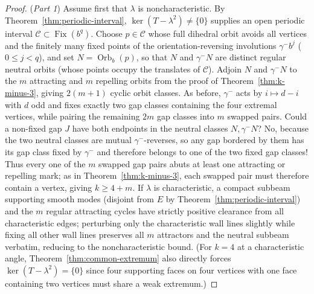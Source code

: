 \documentclass[11pt,reqno]{amsart}
\theoremstyle{definition}
\theoremstyle{remark}
\DeclareMathOperator{\Fix}{Fix}
\begin{document}
\begin{proof}
(\emph{Part 1}) Assume first that $\lambda$ is noncharacteristic. By Theorem~\ref{thm:periodic-interval}, $\ker(T-\lambda^2) \ne \{0\}$ supplies an open periodic interval $\mathcal{C} \subset \Fix(b^q)$. Choose $p \in \mathcal{C}$ whose full dihedral orbit avoids all vertices and the finitely many fixed points of the orientation-reversing involutions $\gamma^- b^j$ ($0 \le j < q$), and set $N = \operatorname{Orb}_b(p)$, so that $N$ and $\gamma^- N$ are distinct regular neutral orbits (whose points occupy the translates of $\mathcal{C}$). Adjoin $N$ and $\gamma^- N$ to the $m$ attracting and $m$ repelling orbits from the proof of Theorem~\ref{thm:k-minus-3}, giving $2(m+1)$ cyclic orbit classes. As before, $\gamma^-$ acts by $i \mapsto d - i$ with $d$ odd and fixes exactly two gap classes containing the four extremal vertices, while pairing the remaining $2m$ gap classes into $m$ swapped pairs. Could a non-fixed gap $J$ have both endpoints in the neutral classes $N, \gamma^- N$? No, because the two neutral classes are mutual $\gamma^-$-reverses, so any gap bordered by them has its gap class fixed by $\gamma^-$ and therefore belongs to one of the two fixed gap classes! Thus every one of the $m$ swapped gap pairs abuts at least one attracting or repelling mark; as in Theorem~\ref{thm:k-minus-3}, each swapped pair must therefore contain a vertex, giving $k \ge 4 + m$. If $\lambda$ is characteristic, a compact subbeam supporting smooth modes (disjoint from $E$ by Theorem~\ref{thm:periodic-interval}) and the $m$ regular attracting cycles have strictly positive clearance from all characteristic edges; perturbing only the characteristic wall lines slightly while fixing all other wall lines preserves all $m$ attractors and the neutral subbeam verbatim, reducing to the noncharacteristic bound. (For $k = 4$ at a characteristic angle, Theorem~\ref{thm:common-extremum} also directly forces $\ker(T-\lambda^2) = \{0\}$ since four supporting faces on four vertices with one face containing two vertices must share a weak extremum.)


\end{proof}
\end{document}
